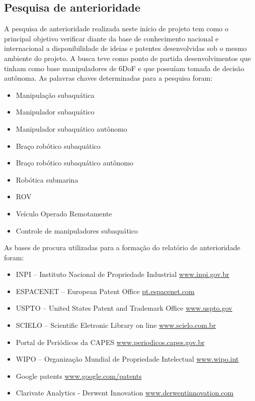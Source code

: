 \subsection{Pesquisa de anterioridade}
\label{sec:pesant}
A pesquisa de anterioridade realizada neste início de projeto tem como o principal objetivo verificar diante da base de conhecimento nacional e internacional a disponibilidade de ideias e patentes desenvolvidas sob o mesmo ambiente do projeto. A busca teve como ponto de partida desenvolvimentos que tinham como base manipuladores de 6DoF e que possuíam tomada de decisão autônoma. As palavras chaves determinadas para a pesquisa foram: 
\begin{itemize}
	\item Manipulação subaquática
	\item Manipulador subaquático
	\item Manipulador subaquático autônomo
	\item Braço robótico subaquático
	\item Braço robótico subaquático autônomo
	\item Robótica submarina
	\item ROV
	\item Veículo Operado Remotamente
	\item Controle de manipuladores subaquático
\end{itemize}
	
As bases de procura utilizadas para a formação do relatório de anterioridade foram:
\begin{itemize}
	\item INPI – Instituto Nacional de Propriedade Industrial 	\url{www.inpi.gov.br}
	\item  ESPACENET – European Patent Office 	\url{pt.espacenet.com}
	\item USPTO – United States Patent and Trademark Office \url{	www.uspto.gov}
	\item SCIELO – Scientific Eletronic Library on line \url{	www.scielo.com.br}
	\item Portal de Periódicos da CAPES	\url{www.periodicos.capes.gov.br}
	\item WIPO – Organização Mundial de Propriedade Intelectual 	\url{www.wipo.int}
	\item Google patents	 \url{www.google.com/patents}
	\item Clarivate Analytics - Derwent Innovation	\url{www.derwentinnovation.com}
\end{itemize}


